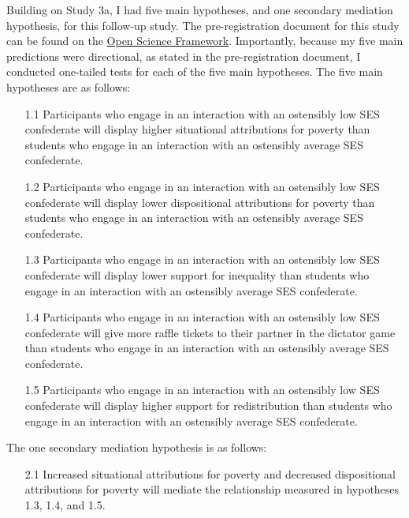 \documentclass{sfuthesis}
\begin{document}
Building on Study 3a, I had five main hypotheses, and one secondary mediation hypothesis, for this follow-up study. The pre-registration document for this study can be found on the \href{https://osf.io/5cugx/register/5730e99a9ad5a102c5745a8a}{Open Science Framework}. Importantly, because my five main predictions were directional, as stated in the pre-registration document, I conducted one-tailed tests for each of the five main hypotheses. The five main hypotheses are as follows:

\begin{itemize}
  \item [1.1]	Participants who engage in an interaction with an ostensibly low SES confederate will display higher situational attributions for poverty than students who engage in an interaction with an ostensibly average SES confederate.\newline
  \item [1.2]	Participants who engage in an interaction with an ostensibly low SES confederate will display lower dispositional attributions for poverty than students who engage in an interaction with an ostensibly average SES confederate.\newline
  \item [1.3]	Participants who engage in an interaction with an ostensibly low SES confederate will display lower support for inequality than students who engage in an interaction with an ostensibly average SES confederate.\newline
  \item [1.4]	Participants who engage in an interaction with an ostensibly low SES confederate will give more raffle tickets to their partner in the dictator game than students who engage in an interaction with an ostensibly average SES confederate.\newline
  \item [1.5]	Participants who engage in an interaction with an ostensibly low SES confederate will display higher support for redistribution than students who engage in an interaction with an ostensibly average SES confederate.
\end{itemize}

\begin{flushleft}
The one secondary mediation hypothesis is as follows:
\end{flushleft}

\begin{itemize}
  \item [2.1]	Increased situational attributions for poverty and decreased dispositional attributions for poverty will mediate the relationship measured in hypotheses 1.3, 1.4, and 1.5.
\end{itemize}
\end{document}
